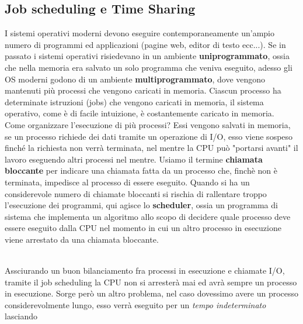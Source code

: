 \documentclass[12pt, letterpaper]{article}
\begin{document}
\subsection{Job scheduling e Time Sharing}\label{scheduling}
I sistemi operativi moderni devono eseguire contemporaneamente un'ampio numero di programmi ed applicazioni 
(pagine web, editor di testo ecc...). Se in passato i sistemi operativi risiedevano in un ambiente \textbf{uniprogrammato},
ossia che nella memoria era salvato un solo programma che veniva eseguito, adesso gli OS moderni godono di un 
ambiente \textbf{multiprogrammato}, dove vengono mantenuti più processi che vengono caricati in memoria.
Ciascun processo ha determinate istruzioni (jobs) che vengono caricati in memoria, il sistema operativo, come è 
di facile intuizione, è costantemente caricato in memoria.\\
Come organizzare l'esecuzione di più processi? Essi vengono salvati in memoria, se un processo richiede 
dei dati tramite un operazione di I/O, esso viene sospeso finché la richiesta non verrà terminata, nel 
mentre la CPU può "portarsi avanti" il lavoro eseguendo altri processi nel mentre. Usiamo il termine 
\textbf{chiamata bloccante} per indicare una chiamata fatta da un processo che, finchè non è terminata,
impedisce al processo di essere eseguito. Quando si ha un considerevole numero di chiamate bloccanti si rischia
di rallentare troppo l'esecuzione dei programmi, qui agisce lo \textbf{scheduler}, ossia un programma di 
sistema che implementa un algoritmo allo scopo di decidere quale processo deve essere eseguito dalla CPU nel 
momento in cui un altro processo in esecuzione viene arrestato da una chiamata bloccante.
\begin{figure}[h]
\end{figure}
\\Assciurando un buon bilanciamento fra processi in esecuzione e chiamate I/O, tramite il job scheduling
la CPU non si arresterà mai ed avrà sempre un processo in esecuzione. Sorge però un altro problema, nel caso 
dovessimo avere un processo considerevolmente lungo, esso verrà eseguito per un \textit{tempo indeterminato} lasciando 
\end{document}
